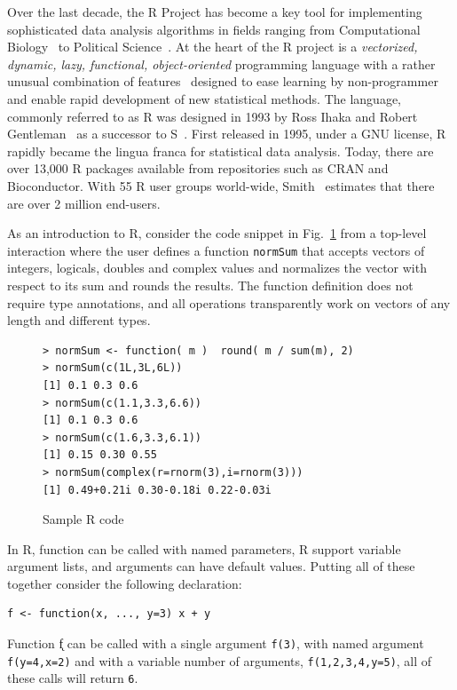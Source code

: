 \documentclass[acmsmall,10pt,review,anonymous]{acmart}\settopmatter{printfolios=true,printccs=false,printacmref=false}
\newcommand{\code}[1]{\lstinline|#1|\xspace}
\begin{document}
Over the last decade, the R Project has become a key tool for implementing
sophisticated data analysis algorithms in fields ranging from Computational
Biology~\cite{R05} to Political Science~\cite{R:Keele:2008}. At the heart of
the R project is a \emph{vectorized, dynamic, lazy, functional,
  object-oriented} programming language with a rather unusual combination of
features~\cite{ecoop12} designed to ease learning by non-programmer and
enable rapid development of new statistical methods.  The language, commonly
referred to as R was designed in 1993 by Ross Ihaka and Robert
Gentleman~\cite{R96} as a successor to S~\cite{S88}.  First released in
1995, under a GNU license, R rapidly became the lingua franca for
statistical data analysis. Today, there are over 13,000 R packages available
from repositories such as CRAN and Bioconductor.  With 55 R user groups
world-wide, Smith~\cite{eco11} estimates that there are over 2 million
end-users.

As an introduction to R, consider the code snippet in Fig.~\ref{sample} from
a top-level interaction where the user defines a function \code{normSum}
that accepts vectors of integers, logicals, doubles and complex values and
normalizes the vector with respect to its sum and rounds the results. The
function definition does not require type annotations, and all operations
transparently work on vectors of any length and different types.

\begin{figure}[!hb]{\small
\begin{lstlisting}[style=R]
> normSum <- function( m )  round( m / sum(m), 2)
> normSum(c(1L,3L,6L))
[1] 0.1 0.3 0.6
> normSum(c(1.1,3.3,6.6))
[1] 0.1 0.3 0.6
> normSum(c(1.6,3.3,6.1))
[1] 0.15 0.30 0.55
> normSum(complex(r=rnorm(3),i=rnorm(3)))
[1] 0.49+0.21i 0.30-0.18i 0.22-0.03i
\end{lstlisting}}
\caption{Sample R code}\label{sample}
\end{figure}

In R, function can be called with named parameters, R support variable
argument lists, and arguments can have default values. Putting all of these
together consider the following declaration:

\begin{lstlisting}[style=R]
f <- function(x, ..., y=3) x + y
\end{lstlisting}

\noindent
Function \k{f} can be called with a single argument \code{f(3)}, with named
argument \code{f(y=4,x=2)} and with a variable number of arguments,
\code{f(1,2,3,4,y=5)}, all of these calls will return \code{6}.
\end{document}
